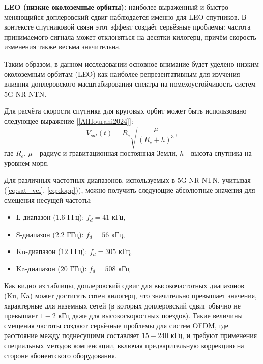 \textbf{LEO (низкие околоземные орбиты):} наиболее выраженный и быстро меняющийся доплеровский сдвиг наблюдается
именно для LEO-спутников. В контексте спутниковой связи этот эффект создаёт серьёзные проблемы: 
частота принимаемого сигнала может отклоняться на десятки килогерц, причём скорость изменения также весьма значительна.

Таким образом, в данном исследовании основное внимание будет уделено низким околоземным орбитам (LEO) 
как наиболее репрезентативным для изучения влияния доплеровского масштабирования спектра 
на помехоустойчивость систем 5G NR NTN.

Для расчёта скорости спутника для круговых орбит может быть использовано следующее выражение [\ref{AlHourani2024}]:
\begin{equation}
    V_{sat}(t) = R_e \sqrt{\frac{\mu}{(R_e + h)^3}},
    \label{eq:sat_vel}
\end{equation}
\noindent где $R_e$, $\mu$ - радиус и гравитационная постоянная Земли, $h$ - высота спутника на уровнем моря.

Для различных частотных диапазонов, используемых в 5G NR NTN, учитывая (\ref{eq:sat_vel}, \ref{eq:dopp})), можно
получить следующие абсолютные значения для смещения несущей частоты:

\begin{itemize}
    \item L-диапазон ($1.6$ ГГц): $f_{d} = 41$ кГц,
    \item S-диапазон ($2.2$ ГГц): $f_{d} = 56$ кГц,
    \item Ku-диапазон ($12$ ГГц): $f_{d} = 305$ кГц,
    \item Ka-диапазон ($20$ ГГц): $f_{d} = 508$ кГц
\end{itemize}

Как видно из таблицы, доплеровский сдвиг для высокочастотных диапазонов (Ku, Ka)
может достигать сотен килогерц, что значительно превышает значения, характерные 
для наземных сетей (в которых доплеровский сдвиг обычно не превышает $1 - 2$ кГц даже для высокоскоростных поездов).
Такие величины смещения частоты создают серьёзные проблемы для систем OFDM, где расстояние между поднесущими 
составляет $15 - 240$ кГц, и требуют применения специальных методов компенсации, 
включая предварительную коррекцию на стороне абонентского оборудования.

